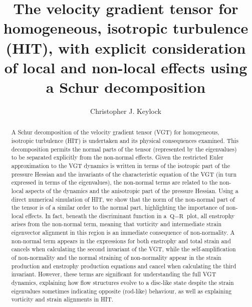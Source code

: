 \documentclass[preprint,amssymb,amsmath,aip,cha]{revtex4-1}
\begin{document}
\title{The velocity gradient tensor for homogeneous, isotropic turbulence ({HIT}), with explicit consideration of local and non-local effects using a {S}chur decomposition}

\author{Christopher J. Keylock}




%
%


\begin{abstract}
A {S}chur decomposition of the velocity gradient tensor (VGT) for homogeneous, isotropic turbulence (HIT) is undertaken and its physical consequences examined. This decomposition permits the normal parts of the tensor (represented by the eigenvalues) to be separated explicitly from the non-normal effects. Given the restricted {E}uler approximation to the VGT dynamics is written in terms of the isotropic part of the pressure Hessian and the invariants of the characteristic equation of the VGT (in turn expressed in terms of the eigenvalues), the non-normal terms are related to the non-local aspects of the dynamics and the anisotropic part of the pressure Hessian. Using a direct numerical simulation of HIT, we show that the norm of the non-normal part of the tensor is of a similar order to the normal part, highlighting the importance of non-local effects. In fact, beneath the discriminant function in a $\mbox{Q}-\mbox{R}$ plot, all enstrophy arises from the non-normal term, meaning that vorticity and intermediate strain eigenvector alignment in this region is an immediate consequence of non-normality. A non-normal term appears in the expressions for both enstrophy and total strain and cancels when calculating the second invariant of the VGT, while the self-amplification of non-normality and the normal straining of non-normality appear in the strain production and enstrophy production equations and cancel when calculating the third invariant. However, these terms are significant for understanding the full VGT dynamics, explaining how flow structures evolve to a disc-like state despite the strain eigenvalues sometimes indicating opposite (rod-like) behaviour, as well as explaining vorticity and strain alignments in HIT.
\end{abstract}
\end{document}
